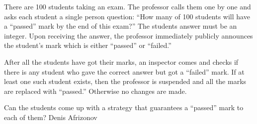 There are 100 students taking an exam. The professor calls them one by one and asks each student a single person question: “How many of 100 students will have a “passed” mark by the end of this exam?” The students answer must be an integer. Upon receiving the answer, the professor immediately publicly announces the student’s mark which is either “passed” or “failed.”

After all the students have got their marks, an inspector comes and checks if there is any student who gave the correct answer but got a “failed” mark. If at least one such student exists, then the professor is suspended and all the marks are replaced with “passed.” Otherwise no changes are made.

Can the students come up with a strategy that guarantees a “passed” mark to each of them? Denis Afrizonov 